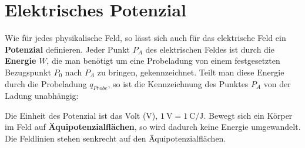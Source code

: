 \documentclass[11pt,twoside=false,open=any]{scrbook}
\begin{document}
\section{Elektrisches Potenzial}

Wie für jedes physikalische Feld, so lässt sich auch für das elektrische Feld ein \textbf{Potenzial} definieren. Jeder Punkt $P_{A}$ des elektrischen Feldes ist durch die \textbf{Energie} $W$, die man benötigt um eine Probeladung von einem festgesetzten Bezugspunkt $P_{0}$ nach $P_{A}$ zu bringen, gekennzeichnet. Teilt man diese Energie durch die Probeladung $q_{Probe}$, so ist die Kennzeichnung des Punktes $P_{A}$ von der Ladung unabhängig:

\begin{center}
   \setlength{\fboxrule}{2pt}
\end{center}

Die Einheit des Potenzial ist das Volt (\si{\volt}), $\SI{1}{\volt} = \SI{1}{\coulomb \per \joule}$. Bewegt sich ein Körper im Feld auf \textbf{Äquipotenzialflächen}, so wird dadurch keine Energie umgewandelt. Die Feldlinien stehen senkrecht auf den Äquipotenzialflächen. 
\end{document}
